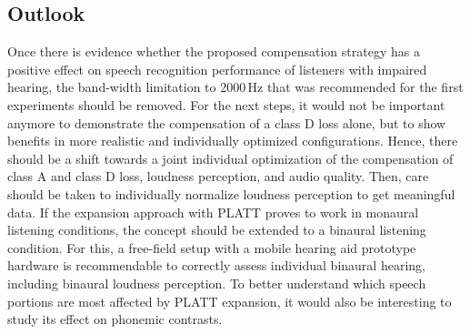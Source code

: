 \documentclass[10pt,a4paper,twocolumn]{article}
\begin{document}
\subsection*{Outlook}
%
Once there is evidence whether the proposed compensation strategy has a positive effect on speech recognition performance of listeners with impaired hearing, the band-width limitation to 2000\,Hz that was recommended for the first experiments should be removed.
%
For the next steps, it would not be important anymore to demonstrate the compensation of a class D loss alone, but to show benefits in more realistic and individually optimized configurations.
%
Hence, there should be a shift towards a joint individual optimization of the compensation of class A and class D loss, loudness perception, and audio quality.
%
Then, care should be taken to individually normalize loudness perception to get meaningful data.
%
If the expansion approach with PLATT proves to work in monaural listening conditions, the concept should be extended to a binaural listening condition.
%
For this, a free-field setup with a mobile hearing aid prototype hardware is recommendable to correctly assess individual binaural hearing, including binaural loudness perception.
%
To better understand which speech portions are most affected by PLATT expansion, it would also be interesting to study its effect on phonemic contrasts.

\end{document}
